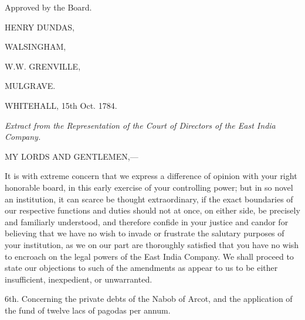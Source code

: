 \hspace{1in} Approved by the Board.

\hspace{3in} HENRY DUNDAS,

\hspace{3in} WALSINGHAM,

\hspace{3in} W.W. GRENVILLE,

\hspace{3in} MULGRAVE.

WHITEHALL, 15th Oct. 1784.

\PRLsep

\textit{Extract from the Representation of the Court of Directors of the East India Company.}
\vspace{0.3cm}

\noindent
MY LORDS AND GENTLEMEN,—

It is with extreme concern that we express a difference of opinion with your right honorable board, in this early exercise of your controlling power; but in so novel an institution, it can scarce be thought extraordinary, if the exact boundaries of our respective functions and duties should not at once, on either side, be precisely and familiarly understood, and therefore confide in your justice and candor for believing that we have no wish to invade or frustrate the salutary purposes of your institution, as we on our part are thoroughly satisfied that you have no wish to encroach on the legal powers of the East India Company. We shall proceed to state our objections to such of the amendments as appear to us to be either insufficient, inexpedient, or unwarranted.

6th. Concerning the private debts of the Nabob of Arcot, and the application of the fund of twelve lacs of pagodas per annum.

